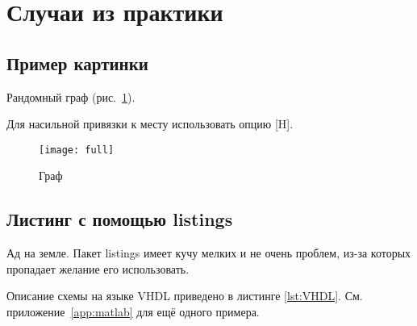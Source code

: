 \section{Случаи из практики}

\subsection{Пример картинки}

Рандомный граф (рис.~\ref{pic:graph}). 

Для насильной привязки к месту использовать опцию [H].\cite{float}

\begin{figure}[ht]
	\centering
	\texttt{[image: full]}
	\caption{Граф}
	\label{pic:graph}
\end{figure}

\subsection{Листинг с помощью listings}

Ад на земле. Пакет listings имеет кучу мелких и не очень проблем, из-за которых пропадает желание его использовать.


Описание схемы на языке VHDL приведено в листинге \ref{lst:VHDL}.
См. приложение~\ref{app:matlab} для ещё одного примера.

